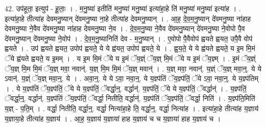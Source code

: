 \documentclass[17pt]{extarticle}
\begin{document}
42. उप॑हूता॒ इत्युप॑ - हू॒ताः॒ । . म॒नु॒ष्या॑ इतीति॑ मनु॒ष्या॑ मनु॒ष्या॑ इत्या॑हा॒हे ति॑ मनु॒ष्या॑ मनु॒ष्या॑ इत्या॑ह । . इत्या॑हा॒हे तीत्या॑ह देवमनु॒ष्यान् दे॑वमनु॒ष्या ना॒हे तीत्या॑ह देवमनु॒ष्यान् । . आ॒ह॒ दे॒व॒म॒नु॒ष्यान् दे॑वमनु॒ष्या ना॑हाह देवमनु॒ष्या ने॒वैव दे॑वमनु॒ष्या ना॑हाह देवमनु॒ष्या ने॒व । . दे॒व॒म॒नु॒ष्या ने॒वैव दे॑वमनु॒ष्यान् दे॑वमनु॒ष्या ने॒वोपो पै॒व दे॑वमनु॒ष्यान् दे॑वमनु॒ष्या ने॒वोप॑ । . दे॒व॒म॒नु॒ष्यानिति॑ देव - म॒नु॒ष्यान् । . ए॒वोपो पै॒वैवोप॑ ह्वयते ह्वयत॒ उपै॒वै वोप॑ ह्वयते । . उप॑ ह्वयते ह्वयत॒ उपोप॑ ह्वयते॒ ये ये ह्व॑यत॒ उपोप॑ ह्वयते॒ ये । . ह्व॒य॒ते॒ ये ये ह्व॑यते ह्वयते॒ य इ॒म मि॒मं ॅये ह्व॑यते ह्वयते॒ य इ॒मम् । . य इ॒म मि॒मं ॅये य इ॒मं ॅय॒ज्ञ्ं ॅय॒ज्ञ् मि॒मं ॅये य इ॒मं ॅय॒ज्ञ्म् । . इ॒मं ॅय॒ज्ञ्ं ॅय॒ज्ञ् मि॒म मि॒मं ॅय॒ज्ञ् मवा॒ नवान्॑. य॒ज्ञ् मि॒म मि॒मं ॅय॒ज्ञ् मवान्॑ । . य॒ज्ञ् मवा॒ नवान्॑. य॒ज्ञ्ं ॅय॒ज्ञ् मवा॒न्॒. ये ये ऽवान्॑. य॒ज्ञ्ं ॅय॒ज्ञ् मवा॒न्॒. ये । . अवा॒न्॒. ये ये ऽवा॒ नवा॒न्॒. ये य॒ज्ञ्प॑तिं ॅय॒ज्ञ्प॑तिं॒ ॅये ऽवा॒ नवा॒न्॒. ये य॒ज्ञ्प॑तिम् । . ये य॒ज्ञ्प॑तिं ॅय॒ज्ञ्प॑तिं॒ ॅये ये य॒ज्ञ्प॑तिं॒ ॅवर्द्धा॒न्॒. वर्द्धान्॑. य॒ज्ञ्प॑तिं॒ ॅये ये य॒ज्ञ्प॑तिं॒ ॅवर्द्धान्॑ । . य॒ज्ञ्प॑तिं॒ ॅवर्द्धा॒न्॒. वर्द्धान्॑. य॒ज्ञ्प॑तिं ॅय॒ज्ञ्प॑तिं॒ ॅवर्द्धा॒ नितीति॒ वर्द्धान्॑. य॒ज्ञ्प॑तिं ॅय॒ज्ञ्प॑तिं॒ ॅवर्द्धा॒ निति॑ । . य॒ज्ञ्प॑ति॒मिति॑ य॒ज्ञ् - प॒ति॒म् । . वर्द्धा॒ नितीति॒ वर्द्धा॒न्॒. वर्द्धा॒ नित्या॑हा॒हे ति॒ वर्द्धा॒न्॒. वर्द्धा॒ नित्या॑ह । . इत्या॑हा॒हे तीत्या॑ह य॒ज्ञाय॑ य॒ज्ञाया॒हे तीत्या॑ह य॒ज्ञाय॑ । . आ॒ह॒ य॒ज्ञाय॑ य॒ज्ञाया॑ हाह य॒ज्ञाय॑ च च य॒ज्ञाया॑ हाह य॒ज्ञाय॑ च । \newline
\pagebreak
{}
\end{document}
